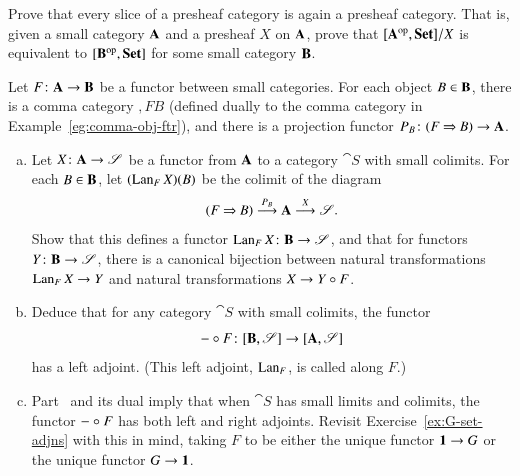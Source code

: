 \begin{question}
Prove that every slice%
%
%
%
of a presheaf category is again a presheaf category.
That is, given a small category $\mathbf{A}$ and a presheaf $X$ on $\mathbf{A}$,
prove that $[\mathbf{A}^{\mathrm{op}},\mathbf{Set}]/X$ is equivalent to $[\mathbf{B}^{\mathrm{op}},\mathbf{Set}]$ for some
small category $\mathbf{B}$.
\end{question}


\begin{question}
\label{ex:kan}
Let $F\from \scat{A} \to \scat{B}$ be a functor between small categories.
For each object $B \in \mathbf{B}$, there is a comma category $\comma{F}{B}$
(defined dually to the comma category in Example~\ref{eg:comma-obj-ftr}),
and there is a projection functor $P_B \from \comma{F}{B} \to \scat{A}$.
%
\begin{enumerate}[(b)]
\item
Let $X \from \scat{A} \to \cat{S}$ be a functor from $\mathbf{A}$ to a
category $\cat{S}$ with small colimits.  For each $B \in \mathbf{B}$, let
$(\operatorname{Lan}_F X)(B)$ be the colimit of the diagram
\[
(F \mathbin{\Rightarrow} B) \stackrel{P_B}{\longrightarrow} \mathbf{A} \stackrel{X}{\longrightarrow} \mathscr{S}.
\]
Show that this defines a functor $\Lan_F X\from \scat{B} \to \cat{S}$, and
that for functors $Y \from \scat{B} \to \cat{S}$, there is a canonical
bijection between natural transformations $\operatorname{Lan}_F X \to Y$ and natural
transformations $X \to Y \mathbin{\circ} F$.

\item
\label{part:left-kan-exists}
Deduce that for any category $\cat{S}$ with small colimits, the functor
\[
\dashbk \of F \from
\ftrcat{\scat{B}}{\cat{S}} \to
\ftrcat{\scat{A}}{\cat{S}}
\]
has a left adjoint.  (This left adjoint, $\operatorname{Lan}_F$, is called
 along $F$.)

\item
Part~ and its dual imply that when $\cat{S}$
has small limits and colimits, the functor $- \mathbin{\circ} F$ has both left
and right adjoints.  Revisit Exercise~\ref{ex:G-set-adjns} with this
in mind, taking $F$ to be either the unique functor $\mathbf{1} \to G$%
%
%
%
%
or the unique functor $G \to \mathbf{1}$.
\end{enumerate}
\end{question}



